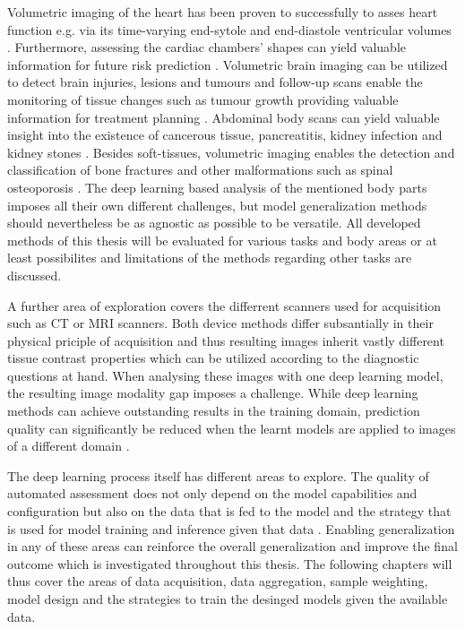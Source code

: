            Volumetric imaging of the heart has been proven to successfully to asses heart function e.g. via its time-varying end-sytole and end-diastole ventricular volumes \citep{}. Furthermore, assessing the cardiac chambers' shapes can yield valuable information for future risk prediction \citep{}.
            Volumetric brain imaging can be utilized to detect brain injuries, lesions and tumours \citep{} and follow-up scans enable the monitoring of tissue changes such as tumour growth providing valuable information for treatment planning \citep{}.
            Abdominal body scans can yield valuable insight into the existence of cancerous tissue, pancreatitis, kidney infection and kidney stones
            \citep{}.
            Besides soft-tissues, volumetric imaging enables the detection and classification of bone fractures and other malformations such as spinal osteoporosis \citep{}.
            The deep learning based analysis of the mentioned body parts imposes all their own different challenges, but model generalization methods should nevertheless be as agnostic as possible to be versatile. All developed methods of this thesis will be evaluated for various tasks and body areas or at least possibilites and limitations of the methods regarding other tasks are discussed.

            A further area of exploration covers the differrent scanners used for acquisition such as CT or MRI scanners. Both device methods differ subsantially in their physical priciple of acquisition and thus resulting images inherit vastly different tissue contrast properties which can be utilized according to the diagnostic questions at hand.
            When analysing these images with one deep learning model, the resulting image modality gap imposes a challenge. While deep learning methods can achieve outstanding results in the training domain, prediction quality can significantly be reduced when the learnt models are applied to images of a different domain \citep{}.

            The deep learning process itself has different areas to explore.
            The quality of automated assessment does not only depend on the model capabilities and configuration but also on the data that is fed to the model and the strategy that is used for model training and inference given that data \citep{}.
            Enabling generalization in any of these areas can reinforce the overall generalization and improve the final outcome which is investigated throughout this thesis. The following chapters will thus cover the areas of data acquisition, data aggregation, sample weighting, model design and the strategies to train the desinged models given the available data.

